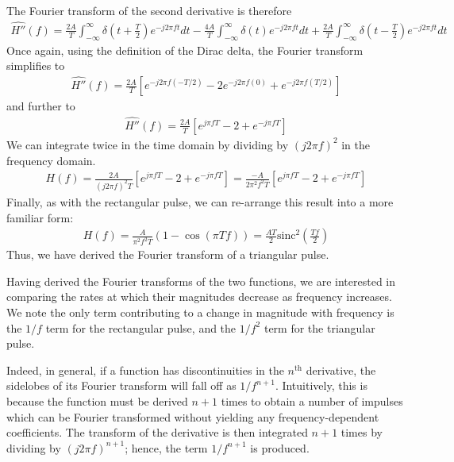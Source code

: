 \documentclass[a4paper, 11pt]{article}
\begin{document}
The Fourier transform of the second derivative is therefore
\begin{align*}
    \widehat{H''}(f) = \frac{2A}{T}\int_{-\infty}^\infty \delta(t+\frac{T}{2}) e^{-j2\pi ft} dt -
             \frac{4A}{T}\int_{-\infty}^\infty \delta(t) e^{-j2\pi ft} dt +
             \frac{2A}{T}\int_{-\infty}^\infty \delta(t-\frac{T}{2}) e^{-j2\pi ft} dt
\end{align*}
Once again, using the definition of the Dirac delta, the Fourier transform
simplifies to
\begin{align*}
    \widehat{H''}(f) = \frac{2A}{T} \left[ e^{-j2\pi f(-T/2)} - 2e^{-j2\pi f(0)} + e^{-j2\pi f(T/2)} \right]
\end{align*}
and further to
\begin{align*}
    \widehat{H''}(f) = \frac{2A}{T} \left[ e^{j\pi fT} - 2 + e^{-j\pi fT} \right]
\end{align*}
We can integrate twice in the time domain by dividing by $(j2\pi f)^2$ in the frequency
domain.
\begin{align*}
    H(f) = \frac{2A}{(j2\pi f)^2 T} \left[ e^{j\pi fT} - 2 + e^{-j\pi fT} \right]
         = \frac{-A}{2\pi^2f^2 T} \left[ e^{j\pi fT} - 2 + e^{-j\pi fT} \right]
\end{align*}
Finally, as with the rectangular pulse, we can re-arrange this result into a
more familiar form:
\begin{align*}
    H(f) = \frac{A}{\pi^2f^2T}(1 - \cos(\pi Tf))
         = \frac{AT}{2} \text{sinc}^2(\frac{Tf}{2})
\end{align*}
Thus, we have derived the Fourier transform of a triangular pulse.

Having derived the Fourier transforms of the two functions, we are interested in
comparing the rates at which their magnitudes decrease as frequency increases.
We note the only term contributing to a change in magnitude with frequency is
the $1/f$ term for the rectangular pulse, and the $1/f^2$ term for the
triangular pulse.

Indeed, in general, if a function has discontinuities in the $n^\text{th}$
derivative, the sidelobes of its Fourier transform will fall off as $1/f^{n+1}$.
Intuitively, this is because the function must be derived $n+1$ times to obtain
a number of impulses which can be Fourier transformed without yielding any
frequency-dependent coefficients. The transform of the derivative is then
integrated $n+1$ times by dividing by $(j2\pi f)^{n+1}$; hence, the term
$1/f^{n+1}$ is produced.
\end{document}
